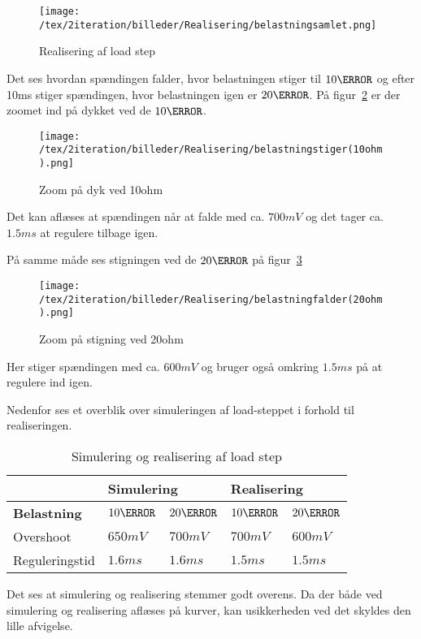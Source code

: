 \begin{figure}[H]
	\center
	\texttt{[image: /tex/2iteration/billeder/Realisering/belastningsamlet.png]}
	\caption{Realisering af load step}
	\label{fig:belastningsamlet}
\end{figure}

Det ses hvordan spændingen falder, hvor belastningen stiger til $10\ohm$ og efter 10ms stiger spændingen, hvor belastningen igen er $20\ohm$. På figur~\ref{fig:belastning_10ohm} er der zoomet ind på dykket ved de $10\ohm$. 
\begin{figure}[H]
	\center
	\texttt{[image: /tex/2iteration/billeder/Realisering/belastningstiger(10ohm).png]}
	\caption{Zoom på dyk ved 10ohm}
	\label{fig:belastning_10ohm}
\end{figure}

\noindent Det kan aflæses at spændingen når at falde med ca. $700mV$ og det tager ca. $1.5ms$ at regulere tilbage igen.

\noindent På samme måde ses stigningen ved de $20\ohm$ på figur~\ref{fig:belastning_20ohm}
\begin{figure}[H]
	\center
	\texttt{[image: /tex/2iteration/billeder/Realisering/belastningfalder(20ohm).png]}
	\caption{Zoom på stigning ved 20ohm}
	\label{fig:belastning_20ohm}
\end{figure}
\noindent Her stiger spændingen med ca. $600mV$ og bruger også omkring $1.5ms$ på at regulere ind igen. 

\noindent Nedenfor ses et overblik over simuleringen af load-steppet i forhold til realiseringen. 

\begin{table}[H] 			
	\centering
	\begin{tabularx}{\textwidth}{|X|l|l|l|l|}
		\hline
		& \multicolumn{2}{|l|}{\textbf{Simulering}} & \multicolumn{2}{|l|}{\textbf{Realisering}} \\ \hline
		\textbf{Belastning} & $10\ohm$ & $20\ohm$ & $10\ohm$ & $20\ohm$ \\ \hline
		Overshoot & $650mV$ & $700mV$ & $700mV$ & $600mV$  \\ \hline
		Reguleringstid & $1.6ms$ & $1.6ms$ & $1.5ms$ & $1.5ms$ \\ \hline
	\end{tabularx}
	\caption{Simulering og realisering af load step}
	\label{tab:Loadstep}
\end{table}
\noindent Det ses at simulering og realisering stemmer godt overens. Da der både ved simulering og realisering aflæses på kurver, kan usikkerheden ved det skyldes den lille afvigelse.


















